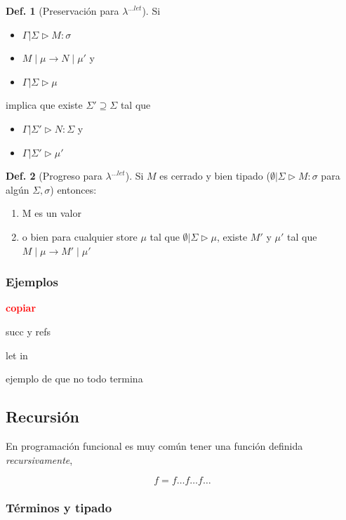 \documentclass{report}
\theoremstyle{definition} %
\newtheorem{definition}{Def.}[chapter]
\newcommand{\todo}[1]{{\textcolor{red}{\textbf{#1}}}}
\newcommand{\tipa}[3]{#1 \rhd #2 : #3} %
\newcommand{\GStipa}[2]{\tipa{\Gamma|\Sigma}{#1}{#2}}
\newcommand{\compat}[2]{#1 \rhd #2} %
\newcommand{\GSCompat}[1]{\compat{\Gamma|\Sigma}{#1}} %
\newcommand{\lambdalet}{\lambda^{\dots let}}
\newcommand{\sreduce}[4]{\reduce{#1\mid#2}{#3\mid#4}}
\newcommand{\sreduceToPrime}[2]{\sreduce{#1}{#2}{#1'}{#2'}}
\newcommand{\reduces}{\to}
\newcommand{\reduce}[2]{#1 \reduces #2}
\begin{document}
\begin{definition}[Preservación para $\lambdalet$]
    Si
    \begin{itemize}
        \item $\GStipa{M}{\sigma}$
        \item $\sreduce{M}{\mu}{N}{\mu'}$ y
        \item $\GSCompat{\mu}$
    \end{itemize}
    
    implica que existe $\Sigma' \supseteq \Sigma$ tal que
    \begin{itemize}
        \item $\tipa{\Gamma|\Sigma'}{N}{\Sigma}$ y
        \item $\compat{\Gamma|\Sigma'}{\mu'}$
    \end{itemize}
\end{definition}

\begin{definition}[Progreso para $\lambdalet$]
    Si $M$ es cerrado y bien tipado ($\tipa{\emptyset|\Sigma}{M}{\sigma}$ para
    algún $\Sigma, \sigma$) entonces:

    \begin{enumerate}
        \item M es un valor
        \item o bien para cualquier store $\mu$ tal que
        $\compat{\emptyset|\Sigma}{\mu}$, existe $M'$ y $\mu'$ tal que $\sreduceToPrime{M}{\mu}$
    \end{enumerate}
\end{definition}

\subsubsection{Ejemplos}

\todo{copiar}

succ y refs

let in

ejemplo de que no todo termina

\subsection{Recursión}

En programación funcional es muy común tener una función definida
\textit{recursivamente},

$$f = f \dots f \dots f \dots$$

\subsubsection{Términos y tipado}
\end{document}
